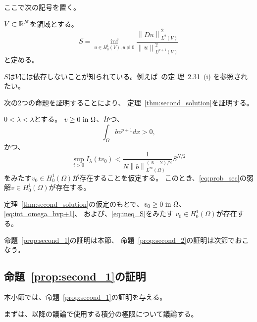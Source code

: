ここで次の記号を置く。

\begin{nota} \label{nota:S_def}
 $V \subset \mathbb{R}^N$を領域とする。
 \begin{equation}
  S = \inf_{u \in H^1_0(V), u \not \equiv 0}
 \frac{\left\| Du \right\|_{L^2(V)}^2}{\left\| u
                                       \right\|_{L^{p+1}(V)}^2}  
 \label{eq:S_def}
 \end{equation}
 と定める。
\end{nota}

$S$は$V$には依存しないことが知られている。例えば~\cite{田中200808}の定
理~2.31~(i) を参照されたい。

次の2つの命題を証明することにより、
定理~\ref{thm:second_solution}を証明する。

\begin{prop} \label{prop:second_1}
 $0 < \lambda < \bar{\lambda}$とする。
 $v \geq 0 ~\text{in}~ \Omega$、かつ、
 \begin{equation}
  \int_\Omega b v^{p+1} dx > 0, \label{eq:int_omega_bvp+1}  
 \end{equation}
 かつ、
 \begin{equation}
  \sup_{t > 0} I_\lambda (tv_0) < 
   \frac{1}{N\left\| b
             \right\|_{L^\infty(\Omega)} ^{(N-2)/2}} S^{N/2} 
   \label{eq:ineq_S}
 \end{equation}
 をみたす$v_0 \in H_0^1(\Omega)$が存在することを仮定する。
 このとき、\ref{eq:prob_sec}の弱解$v \in H_0^1(\Omega)$が存在する。
\end{prop}

\begin{prop} \label{prop:second_2}
 定理~\ref{thm:second_solution}の仮定のもとで、$v_0 \geq 0 ~\text{in}~
 \Omega$、\eqref{eq:int_omega_bvp+1}、
 および、\eqref{eq:ineq_S}をみたす
 $v_0 \in H_0^1(\Omega)$が存在する。
\end{prop}

命題~\ref{prop:second_1}の証明は本節、
命題~\ref{prop:second_2}の証明は次節でおこなう。

\subsection{命題~\ref{prop:second_1}の証明}

本小節では、命題~\ref{prop:second_1}の証明を与える。

まずは、以降の議論で使用する積分の極限について議論する。

